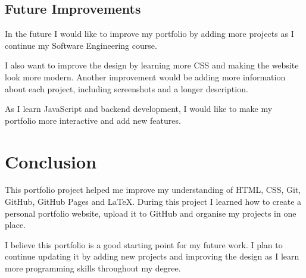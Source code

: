 \documentclass[a4paper,12pt]{article}
\begin{document}
\subsection{Future Improvements}

In the future I would like to improve my portfolio by adding more projects
as I continue my Software Engineering course.

I also want to improve the design by learning more CSS and making the
website look more modern. Another improvement would be adding more
information about each project, including screenshots and a longer
description.

As I learn JavaScript and backend development, I would like to make my
portfolio more interactive and add new features.

\section{Conclusion}

This portfolio project helped me improve my understanding of HTML, CSS,
Git, GitHub, GitHub Pages and LaTeX. During this project I learned how to
create a personal portfolio website, upload it to GitHub and organise my
projects in one place.

I believe this portfolio is a good starting point for my future work. I
plan to continue updating it by adding new projects and improving the
design as I learn more programming skills throughout my degree.
\end{document}
